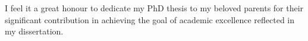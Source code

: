 
\begin{dedication} %

I feel it a great honour to dedicate my PhD thesis to my beloved parents for their significant contribution in achieving the goal of academic excellence reflected in my dissertation.
\end{dedication}


